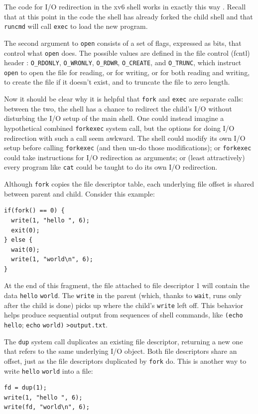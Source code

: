 The code for I/O redirection in the xv6 shell works in exactly this way
.
Recall that at this point in the code the shell has already forked the
child shell and that 
\lstinline{runcmd} 
will call
\lstinline{exec}
to load the new program.

The second argument to \lstinline{open} consists of a set of
flags, expressed as bits, that control what \lstinline{open}
does. The possible values are defined in the file control (fcntl) header
:
\lstinline{O_RDONLY},
\lstinline{O_WRONLY},
\lstinline{O_RDWR},
\lstinline{O_CREATE}, and
\lstinline{O_TRUNC},
which instruct \lstinline{open} to
open the file for reading,
or for writing,
or for both reading and writing,
to create the file if it doesn't exist,
and to truncate the file to zero length.

Now it should be clear why it is helpful that
\lstinline{fork}
and 
\lstinline{exec} 
are separate calls: between the two, the shell has a chance
to redirect the child's I/O without disturbing the I/O setup of the main shell.
One could instead imagine a hypothetical combined
\lstinline{forkexec} system call,
but the options for doing I/O redirection with such a call
seem awkward.
The shell could modify its own I/O
setup before calling \lstinline{forkexec} (and then
un-do those modifications); or
\lstinline{forkexec} could take instructions for I/O
redirection as arguments;
or (least attractively) every program like \lstinline{cat} could
be taught to do its own I/O redirection.

Although
\lstinline{fork}
copies the file descriptor table, each underlying file offset is shared
between parent and child.
Consider this example:
\begin{lstlisting}[]
if(fork() == 0) {
  write(1, "hello ", 6);
  exit(0);
} else {
  wait(0);
  write(1, "world\n", 6);
}
\end{lstlisting}
At the end of this fragment, the file attached to file descriptor 1
will contain the data
\lstinline{hello}
\lstinline{world}.
The
\lstinline{write}
in the parent
(which, thanks to
\lstinline{wait},
runs only after the child is done)
picks up where the child's
\lstinline{write}
left off.
This behavior helps produce sequential output from sequences
of shell commands, like
\lstinline{(echo}
\lstinline{hello};
\lstinline{echo}
\lstinline{world)}
\lstinline{>output.txt}.

The
\lstinline{dup}
system call duplicates an existing file descriptor,
returning a new one that refers to the same underlying I/O object.
Both file descriptors share an offset, just as the file descriptors
duplicated by
\lstinline{fork}
do.
This is another way to write
\lstinline{hello}
\lstinline{world}
into a file:
\begin{lstlisting}[]
fd = dup(1);
write(1, "hello ", 6);
write(fd, "world\n", 6);
\end{lstlisting}

